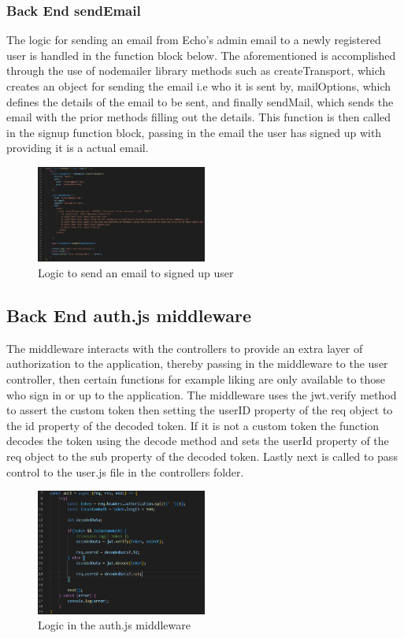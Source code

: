 \subsubsection{Back End sendEmail}\label{subsub:sendMail}
The logic for sending an email from Echo's admin email to a newly registered user is handled in the function block below. The aforementioned is accomplished through the use of nodemailer library methods such as createTransport, which creates an object for sending the email i.e who it is sent by, mailOptions, which defines the details of the email to be sent, and finally sendMail, which sends the email with the prior methods filling out the details. This function is then called in the signup function block, passing in the email the user has signed up with providing it is a actual email.
\begin{figure}[h!]
    \centering
    \includegraphics[width=0.5\textwidth]{images/sendEmailController.png}
    \caption{Logic to send an email to signed up user}
    \label{image:sendEmailController}
\end{figure}

\subsection{Back End auth.js middleware}
The middleware interacts with the controllers to provide an extra layer of authorization to the application, thereby passing in the middleware to the user controller, then certain functions for example liking are only available to those who sign in or up to the application. The middleware uses the jwt.verify method to assert the custom token then setting the userID property of the req object to the id property of the decoded token. If it is not a custom token the function decodes the token using the decode method and sets the userId property of the req object to the sub property of the decoded token. Lastly next is called to pass control to the user.js file in the controllers folder.

\begin{figure}[h!]
    \centering
    \includegraphics[width=0.5\textwidth]{images/BackEndMiddle.png}
    \caption{Logic in the auth.js middleware}
    \label{image:BackEndMiddle}
\end{figure}

